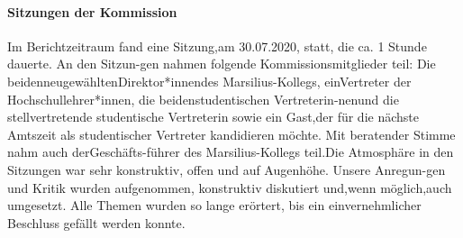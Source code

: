 \paragraph{Sitzungen der Kommission}
Im Berichtzeitraum fand eine Sitzung,am 30.07.2020, statt, die ca. 1 Stunde dauerte. An den Sitzun-gen nahmen  folgende  Kommissionsmitglieder  teil:  Die  beidenneugewähltenDirektor*innendes Marsilius-Kollegs, einVertreter der Hochschullehrer*innen, die beidenstudentischen Vertreterin-nenund die stellvertretende studentische Vertreterin sowie ein Gast,der für die nächste Amtszeit als studentischer Vertreter kandidieren möchte. Mit beratender Stimme nahm auch derGeschäfts-führer des Marsilius-Kollegs teil.Die Atmosphäre in den Sitzungen war sehr konstruktiv, offen und auf Augenhöhe. Unsere Anregun-gen und Kritik wurden aufgenommen, konstruktiv diskutiert und,wenn möglich,auch umgesetzt. Alle Themen wurden so lange erörtert, bis ein einvernehmlicher Beschluss gefällt werden konnte.
